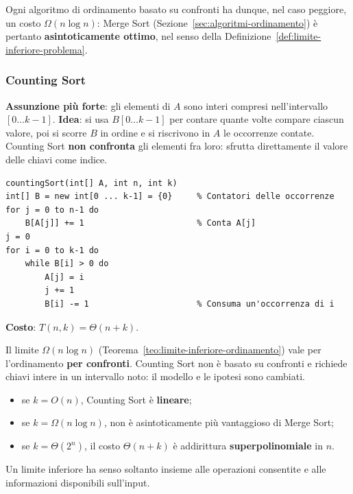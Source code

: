 \documentclass[12pt, a4paper]{article}
\begin{document}
Ogni algoritmo di ordinamento basato su confronti ha dunque, nel caso peggiore, un costo $\Omega(n\log n)$: Merge Sort (Sezione~\ref{sec:algoritmi-ordinamento}) è pertanto \textbf{asintoticamente ottimo}, nel senso della Definizione~\ref{def:limite-inferiore-problema}.

\subsubsection{Counting Sort}

\begin{tcolorbox}[colback=lightergray!10, colframe=tocsec, title=\textbf{Counting Sort Cambia le Ipotesi}]
\textbf{Assunzione più forte}: gli elementi di $A$ sono interi compresi nell'intervallo $[0\ldots k-1]$.
\textbf{Idea}: si usa $B[0\ldots k-1]$ per contare quante volte compare ciascun valore, poi si scorre $B$ in ordine e si riscrivono in $A$ le occorrenze contate. Counting Sort \textbf{non confronta} gli elementi fra loro: sfrutta direttamente il valore delle chiavi come indice.
\end{tcolorbox}

\begin{verbatim}
countingSort(int[] A, int n, int k)
int[] B = new int[0 ... k-1] = {0}     % Contatori delle occorrenze
for j = 0 to n-1 do
    B[A[j]] += 1                       % Conta A[j]
j = 0
for i = 0 to k-1 do
    while B[i] > 0 do
        A[j] = i
        j += 1
        B[i] -= 1                      % Consuma un'occorrenza di i
\end{verbatim}
\textbf{Costo}: $T(n,k) = \Theta(n+k)$.

\begin{tcolorbox}[colback=lightergray!5, colframe=tocsubsec, title=\textbf{Perché Non Contraddice il Limite Inferiore?}]
Il limite $\Omega(n\log n)$ (Teorema~\ref{teo:limite-inferiore-ordinamento}) vale per l'ordinamento \textbf{per confronti}. Counting Sort non è basato su confronti e richiede chiavi intere in un intervallo noto: il modello e le ipotesi sono cambiati.
\begin{itemize}
    \item se $k = O(n)$, Counting Sort è \textbf{lineare};
    \item se $k = \Omega(n\log n)$, non è asintoticamente più vantaggioso di Merge Sort;
    \item se $k = \Theta(2^n)$, il costo $\Theta(n+k)$ è addirittura \textbf{superpolinomiale} in $n$.
\end{itemize}
Un limite inferiore ha senso soltanto insieme alle operazioni consentite e alle informazioni disponibili sull'input.
\end{tcolorbox}
\end{document}
